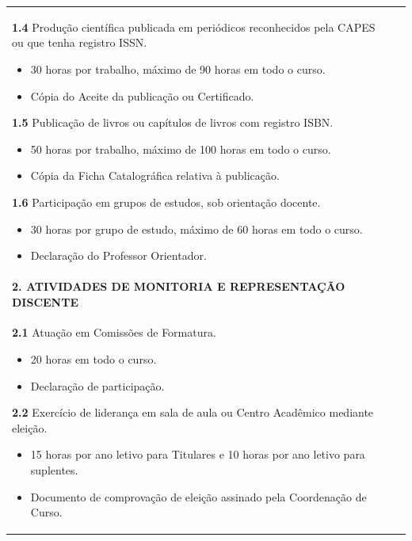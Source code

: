 \documentclass[
	12pt,				%
	openright,			%
	twoside,			%
	a4paper,			%
	chapter=TITLE,		%
	english,			%
	french,				%
	spanish,			%
	brazil,				%
	]{abntex2}
\begin{document}
\begin{quadro}
{\begin{tabularx}{\textwidth}{X X}
	\textbf{1.4}  Produção científica publicada em periódicos reconhecidos pela CAPES ou que tenha registro ISSN.
	\begin{itemize}[itemsep=-0.25em, topsep=0em]
 	  \item[\faClockO]  30 horas por trabalho, máximo de 90 horas em todo o curso. 
 	  \item[\faCheckCircle] Cópia do Aceite da publicação ou Certificado. 
 	\end{itemize}
	 
	\textbf{1.5} Publicação de livros ou capítulos de livros com registro ISBN.
	\begin{itemize}[itemsep=-0.25em, topsep=0em]
 	  \item[\faClockO] 50 horas por trabalho, máximo de 100 horas em todo o curso. 
 	  \item[\faCheckCircle] Cópia da Ficha Catalográfica relativa à publicação. 
	\end{itemize}
	 
	\textbf{1.6} Participação em grupos de estudos, sob orientação docente.
	\begin{itemize}[itemsep=-0.25em, topsep=0em]
 	  \item[\faClockO]  30 horas por grupo de estudo, máximo de 60 horas em todo o curso. 
 	  \item[\faCheckCircle]  Declaração do Professor Orientador. \vspace{-1em}
	\end{itemize}  \\
 
	\cellcolor{gray!20}\bfseries{2. ATIVIDADES DE MONITORIA E REPRESENTAÇÃO DISCENTE} \\
	\cellcolor{gray!02}\textbf{2.1}  Atuação em Comissões de Formatura.
	\begin{itemize}[itemsep=-0.25em, topsep=0em]
 	  \item[\faClockO]   20 horas em todo o curso.
 	  \item[\faCheckCircle] Declaração de participação.
 	\end{itemize}
	 
	\textbf{2.2} Exercício de liderança em sala de aula ou Centro Acadêmico mediante eleição. 
	\begin{itemize}[itemsep=-0.25em, topsep=0em]
 	  \item[\faClockO]  15 horas por ano letivo para Titulares e 10 horas por ano letivo para suplentes.
 	  \item[\faCheckCircle]  Documento de comprovação de eleição assinado pela Coordenação de Curso.
	\end{itemize}
	 

\end{tabularx}}
\end{quadro}
\end{document}
